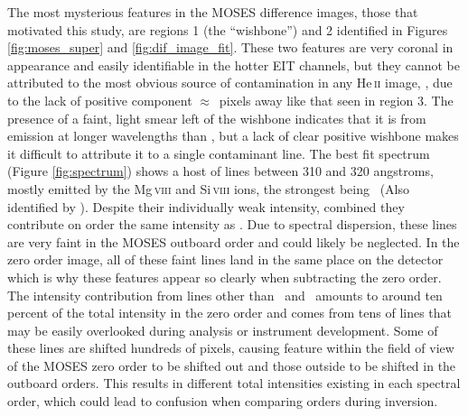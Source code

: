 	The most mysterious features in the MOSES difference images, those that motivated this study, are regions 1 (the ``wishbone'') and 2 identified in Figures \ref{fig:moses_super} and \ref{fig:dif_image_fit}.
	These two features are very coronal in appearance and easily identifiable in the hotter EIT channels, but they cannot be attributed to the most obvious source of contamination in any He\,\textsc{ii} image, \sixi, due to the lack of positive component $\approx$\sixipix\ pixels away like that seen in region 3.
	The presence of a faint, light smear left of the wishbone indicates that it is from emission at longer wavelengths than \heii, but a lack of clear positive wishbone makes it difficult to attribute it to a single contaminant line.
	The best fit spectrum (Figure \ref{fig:spectrum}) shows a host of lines between 310 and 320 angstroms, mostly emitted by the Mg\,\textsc{viii} and Si\,\textsc{viii} ions, the strongest being \ (Also identified by \citet{Rust2017}).
	Despite their individually weak intensity, combined they contribute on order the same intensity as \sixi.
	Due to spectral dispersion, these lines are very faint in the MOSES outboard order and could likely be neglected.
	In the zero order image, all of these faint lines land in the same place on the detector which is why these features appear so clearly when subtracting the zero order.	
	The intensity contribution from lines other than \heii\ and \sixi\ amounts to around ten percent of the total intensity in the zero order and comes from tens of lines that may be easily overlooked during analysis or instrument development.
	Some of these lines are shifted hundreds of pixels, causing feature within the field of view of the MOSES zero order to be shifted out and those outside to be shifted in the outboard orders.
	This results in different total intensities existing in each spectral order, which could lead to confusion when comparing orders during inversion.
	
